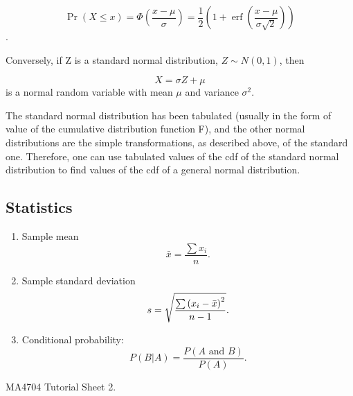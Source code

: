 \documentclass[12pt]{report}
\begin{document}
{{\[\Pr(X \le x)
=
\Phi
\left(
\frac{x-\mu}{\sigma}
\right)
=
\frac{1}{2}
\left(
1 + \operatorname{erf}
\left(
\frac{x-\mu}{\sigma\sqrt{2}}
\right)
\right)\]
.




Conversely, if Z is a standard normal distribution, $Z \sim N(0,1)$, then

\[X = \sigma Z + \mu\]
is a normal random variable with mean $\mu$ and variance $\sigma^2$.

The standard normal distribution has been tabulated (usually in the form of value of the cumulative distribution function F), and the other normal distributions are the simple transformations, as described above, of the standard one. Therefore, one can use tabulated values of the cdf of the standard normal distribution to 
find values of the cdf of a general normal distribution.



\subsection{Statistics}

\begin{enumerate}
	\item Sample mean
	\begin{equation*}
	\bar{x}=\frac{\sum x_{i}}{n}.
	\end{equation*}
	
	\item Sample standard deviation
	\begin{equation*}
	s=\sqrt{\frac{\sum \left( x_{i}-\bar{x}\right) ^{2}}{%
			n-1}}.
	\end{equation*}
	
	\item Conditional probability:
	\begin{equation*}
	P(B|A)=\frac{P\left( A\text{ and }B\right) }{P\left( A\right) }.
	\end{equation*}
	
	
	
	
	
	
\end{enumerate}
MA4704 Tutorial Sheet 2. 


}}
\end{document}
